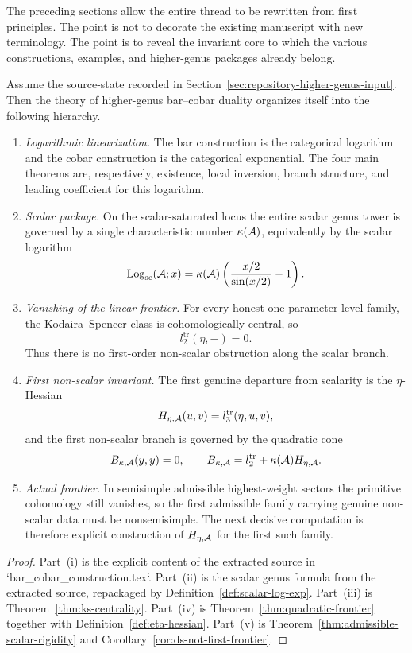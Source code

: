 The preceding sections allow the entire thread to be rewritten from first
principles.  The point is not to decorate the existing manuscript with new
terminology.  The point is to reveal the invariant core to which the various
constructions, examples, and higher-genus packages already belong.

\begin{maintheorem}
\label{mthm:platonic-form}
Assume the source-state recorded in
Section~\ref{sec:repository-higher-genus-input}.  Then the theory of higher-genus
bar--cobar duality organizes itself into the following hierarchy.
\begin{enumerate}[label=\textup{(\roman*)}]
\item \emph{Logarithmic linearization.}
The bar construction is the categorical logarithm and the cobar construction is
the categorical exponential.  The four main theorems are, respectively,
existence, local inversion, branch structure, and leading coefficient for this
logarithm.
\item \emph{Scalar package.}
On the scalar-saturated locus the entire scalar genus tower is governed by a
single characteristic number $\kappa(\mathcal{A})$, equivalently by the scalar
logarithm
\[
\mathrm{Log}_{\mathrm{sc}}(\mathcal{A};x)=\kappa(\mathcal{A})\left(\frac{x/2}{\sin(x/2)}-1\right).
\]
\item \emph{Vanishing of the linear frontier.}
For every honest one-parameter level family, the Kodaira--Spencer class is
cohomologically central, so
\[
l_2^{\mathrm{tr}}(\eta,-)=0.
\]
Thus there is no first-order non-scalar obstruction along the scalar branch.
\item \emph{First non-scalar invariant.}
The first genuine departure from scalarity is the $\eta$-Hessian
\[
H_{\eta,\mathcal{A}}(u,v)=l_3^{\mathrm{tr}}(\eta,u,v),
\]
and the first non-scalar branch is governed by the quadratic cone
\[
B_{\kappa,\mathcal{A}}(y,y)=0,
\qquad
B_{\kappa,\mathcal{A}}=l_2^{\mathrm{tr}}+\kappa(\mathcal{A})H_{\eta,\mathcal{A}}.
\]
\item \emph{Actual frontier.}
In semisimple admissible highest-weight sectors the primitive cohomology still
vanishes, so the first admissible family carrying genuine non-scalar data must
be nonsemisimple.  The next decisive computation is therefore explicit
construction of $H_{\eta,\mathcal{A}}$ for the first such family.
\end{enumerate}
\end{maintheorem}

\begin{proof}
Part~\textup{(i)} is the explicit content of the extracted source in
`bar\_cobar\_construction.tex`.  Part~\textup{(ii)} is the scalar genus formula
from the extracted source, repackaged by Definition~\ref{def:scalar-log-exp}.
Part~\textup{(iii)} is Theorem~\ref{thm:ks-centrality}.  Part~\textup{(iv)} is
Theorem~\ref{thm:quadratic-frontier} together with
Definition~\ref{def:eta-hessian}.  Part~\textup{(v)} is
Theorem~\ref{thm:admissible-scalar-rigidity} and
Corollary~\ref{cor:ds-not-first-frontier}.\end{proof}


